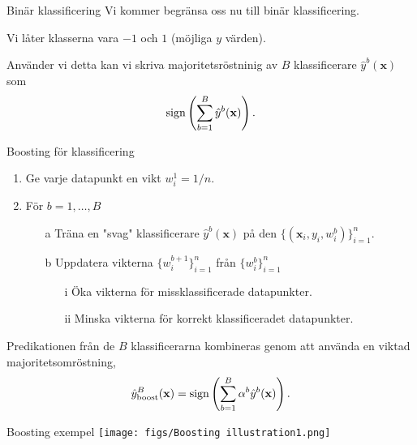 \documentclass[10pt,english]{beamer}
\begin{document}
\begin{frame}{Binär klassificering}
    Vi kommer begränsa oss nu till binär klassificering.

    Vi låter klasserna vara $-1$ och $1$ (möjliga $y$ värden).

    Använder vi detta kan vi skriva majoritetsröstninig av $B$ klassificerare $\hat{y}^{b}(\mathbf{x})$ som
    \begin{equation*}
        \operatorname*{sign} \left(\sum_{b=1}^{B} \hat{y}^{b}(\mathbf{x})\right).
    \end{equation*}
\end{frame}

\begin{frame}{Boosting för klassificering}
    
    \begin{enumerate}
        \item Ge varje datapunkt en vikt $w_i^1 = 1/n$.
        \item För $b = 1, \ldots, B$
        \begin{enumerate}
            \item[a] Träna en "svag" klassificerare $\hat{y}^{b}(\mathbf{x})$ på den  $\{(\mathbf{x}_i,y_i,w_i^b)\}_{i=1}^{n}$.
            \item[b] Uppdatera vikterna $\{w_{i}^{b+1}\}_{i=1}^{n}$ från $\{w_{i}^{b}\}_{i=1}^{n}$
            \begin{enumerate}
                \item[i] Öka vikterna för missklassificerade datapunkter.
                \item[ii] Minska vikterna för korrekt klassificeradet datapunkter. 
            \end{enumerate}
        \end{enumerate}
    \end{enumerate}

    Predikationen från de $B$ klassificerarna kombineras genom att använda en viktad majoritetsomröstning,
    \begin{equation*}
        \hat{y}^{B}_{\text{boost}}(\mathbf{x}) = \operatorname*{sign} \left(\sum_{b=1}^{B} \alpha^b \hat{y}^b(\mathbf{x})\right).
    \end{equation*}

\end{frame}

\begin{frame}{Boosting exempel}
    \texttt{[image: figs/Boosting illustration1.png]}
\end{frame}
\end{document}
